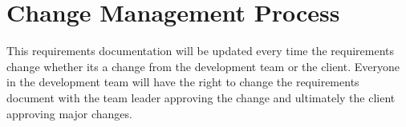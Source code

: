 \documentclass[12pt, a4paper]{article}
\begin{document}
	

	\section{Change Management Process}
	This requirements documentation will be updated every time the requirements change whether its a change from the development team or the client. Everyone in the development team will have the right to change the requirements document with the team leader approving the change and ultimately the client approving major changes.

	\pagebreak

	
	
	\newpage
	\nocite{*}
	
	

	
\end{document}
